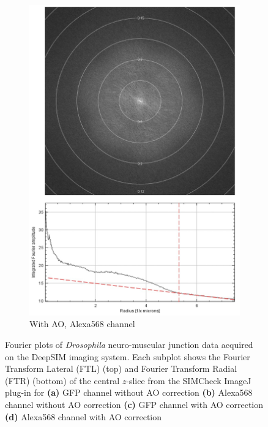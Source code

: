 \begin{figure}
\begin{subfigure}[t]{0.45\textwidth}
		\includegraphics[width=\linewidth]{images/DeepSIM_NMJ_AO_Alexa568_ft_and_plot.jpg}
		\caption{With AO, Alexa568 channel}
		\label{fig:DeepSIM_NMJ_AO_Alexa568_ft_and_plot}
	\end{subfigure}
	\caption[Fourier plots of \textit{Drosophila} neuro-muscular junction 
	data acquired on the DeepSIM imaging system]{Fourier plots of 
		\textit{Drosophila} neuro-muscular junction data acquired on the 
		DeepSIM imaging system. Each subplot shows the Fourier Transform 
		Lateral (FTL) (top) and Fourier	Transform Radial (FTR) (bottom) of the 
		central $z$-slice from the SIMCheck ImageJ 
		plug-in\cite{ball2015simcheck} for \textbf{(a)} GFP channel without AO 
		correction \textbf{(b)} Alexa568 channel without AO correction 
		\textbf{(c)} GFP channel with AO correction \textbf{(d)} Alexa568 
		channel with AO correction}
	\label{fig:NMJ_ft_data}
\end{figure}
